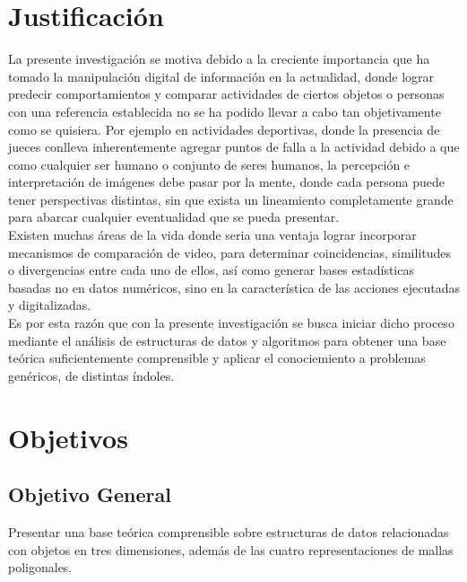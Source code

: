 \documentclass[11pt,letterpaper]{article}     %
\begin{document}
\section{Justificación}
La presente investigaci\' on se motiva debido a la creciente importancia que ha tomado la manipulaci\' on digital de informaci\' on en la actualidad, donde lograr predecir comportamientos y comparar actividades de ciertos objetos o personas con una referencia establecida no se ha podido llevar a cabo tan objetivamente como se quisiera. Por ejemplo en actividades deportivas, donde la presencia de jueces conlleva inherentemente agregar puntos de falla a la actividad debido a que como cualquier ser humano o conjunto de seres humanos, la percepci\' on e interpretaci\' on de im\' agenes debe pasar por la mente, donde cada persona puede tener perspectivas distintas, sin que exista un lineamiento completamente grande para abarcar cualquier eventualidad que se pueda presentar.\\
Existen muchas \' areas de la vida donde seria una ventaja lograr incorporar mecanismos de comparaci\' on de video, para determinar coincidencias, similitudes o divergencias entre cada uno de ellos, as\'i como generar bases estad\' isticas basadas no en datos num\' ericos, sino en la caracter\' istica de las acciones ejecutadas y digitalizadas.\\
Es por esta raz\' on que con la presente investigaci\' on se busca iniciar dicho proceso mediante el an\' alisis de estructuras de datos y algoritmos para obtener una base te\' orica suficientemente comprensible y aplicar el conociemiento a problemas gen\' ericos, de distintas \' indoles.


\section{Objetivos}
\subsection{Objetivo General}
Presentar una base te\' orica comprensible sobre estructuras de datos relacionadas con objetos en tres dimensiones, adem\' as de las cuatro representaciones de mallas poligonales.
\end{document}
